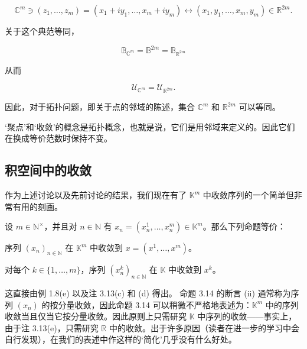 \begin{remark}
\begin{items}
\[
\mathbb{C}^{m}\ni(z_{1},\ldots,z_{m})=(x_{1}+i y_{1},\ldots,x_{m}+i y_{m})\longleftrightarrow(x_{1},y_{1},\ldots,x_{m},y_{m})\in\mathbb{R}^{2m}.
\]

关于这个典范等同，

\[
\mathbb{B}_{\mathbb{C}^{m}}=\mathbb{B}^{2m}=\mathbb{B}_{\mathbb{R}^{2m}}
\]

从而

\[
\mathcal{U}_{\mathbb{C}^{m}}=\mathcal{U}_{\mathbb{R}^{2m}}.
\]

因此，对于拓扑问题，即关于点的邻域的陈述，集合 $ \mathbb{C}^m $ 和 $ \mathbb{R}^{2m} $ 可以等同。

\item[（f）]

‘聚点’和‘收敛’的概念是拓扑概念，也就是说，它们是用邻域来定义的。因此它们在换成等价范数时保持不变。

\end{items}

\end{remark}

\subsection*{积空间中的收敛}

作为上述讨论以及先前讨论的结果，我们现在有了 $ \mathbb{K}^m $ 中收敛序列的一个简单但非常有用的刻画。

\begin{proposition}

设 $ m \in \mathbb{N}^\times $，并且对 $ n \in \mathbb{N} $ 有 $ x_n = (x_n^1, \ldots, x_n^m) \in \mathbb{K}^m $。那么下列命题等价：

\begin{subitems}
\item

序列 $ (x_n)_{n \in \mathbb{N}} $ 在 $ \mathbb{K}^m $ 中收敛到 $ x = (x^1, \ldots, x^m) $。

\item

对每个 $ k \in \{1, \ldots, m\} $，序列 $ (x_n^k)_{n \in \mathbb{N}} $ 在 $ \mathbb{K} $ 中收敛到 $ x^k $。

\proofhead
这直接由例 1.8(e) 以及注 3.13(c) 和 (d) 得出。
命题 3.14 的断言 (ii) 通常称为序列 $ (x_n) $ 的按分量收敛，因此命题 3.14 可以稍微不严格地表述为：$ \mathbb{K}^m $ 中的序列收敛当且仅当它按分量收敛。因此原则上只需研究 $ \mathbb{K} $ 中序列的收敛——事实上，由于注 3.13(e)，只需研究 $ \mathbb{R} $ 中的收敛。出于许多原因（读者在进一步的学习中会自行发现），在我们的表述中作这样的‘简化’几乎没有什么好处。
\end{subitems}

\end{proposition}

